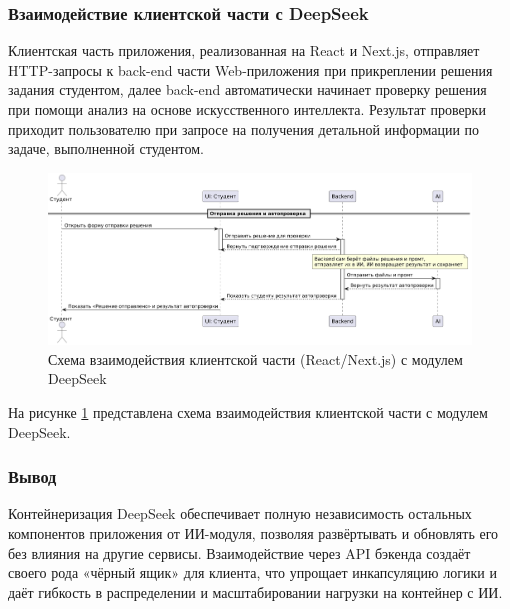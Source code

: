 \subsubsection{Взаимодействие клиентской части с DeepSeek}

Клиентская часть приложения, реализованная на React и Next.js, отправляет HTTP-запросы к back-end части Web-приложения при прикреплении решения задания студентом, далее back-end автоматически начинает проверку решения при помощи анализ на основе искусственного интеллекта. Результат проверки приходит пользователю при запросе на получения детальной информации по задаче, выполненной студентом.

\begin{figure}[h]
    \centering
    \includegraphics[width=0.8\linewidth]{static/diagrams/TaskSendStudentDiagram.png}
    \caption{Схема взаимодействия клиентской части (React/Next.js) с модулем DeepSeek}
    \label{fig:client-deepseek}
\end{figure}

На рисунке \ref{fig:client-deepseek} представлена схема взаимодействия клиентской части с модулем DeepSeek.

\subsubsection{Вывод}

Контейнеризация DeepSeek обеспечивает полную независимость остальных компонентов приложения от ИИ-модуля, позволяя развёртывать и обновлять его без влияния на другие сервисы. Взаимодействие через API бэкенда создаёт своего рода «чёрный ящик» для клиента, что упрощает инкапсуляцию логики и даёт гибкость в распределении и масштабировании нагрузки на контейнер с ИИ.


